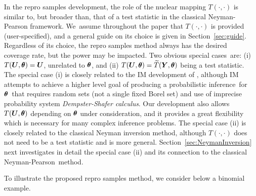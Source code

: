 \documentclass[12pt]{article}
\theoremstyle{shortspace}
\def\*#1{\bm{#1}}
\def\btheta{\mathop{\theta\kern-.45em\hbox{$\theta$}}\nolimits}
\begin{document}
In the repro samples development, the role of the nuclear mapping  $T(\cdot, \cdot)$ is similar to, but broader than, that of a test statistic in the classical Neyman-Pearson framework. We~assume throughout the paper that  $T(\cdot, \cdot)$ is provided (user-specified), and    
a general guide on its choice is given in  Section~\ref{sec:guide}.
Regardless of its choice, the repro samples method always has the desired coverage rate, but the power may be impacted.
Two obvious special cases~are: (i) 
$T(\*U,\btheta) = \*U$, unrelated to $\btheta$, and (ii) $T(\*U,\btheta) = \widetilde T(\*Y, \btheta)$ being a test statistic.   
The special case (i) 
is closely related to the IM development of \cite{martin2013inferential}, although IM attempts to achieve a higher level goal of producing a  probabilistic inference~for~$\btheta$~that requires random sets (not a single fixed Borel set) and use of imprecise probability system {\it Dempster-Shafer calculus}.
Our development also allows $T(\*U,\btheta)$ depending on $\btheta$ under consideration, and it provides a great  flexibility which is necessary for many complex inference problems.
The special case (ii)  is closely related to the classical Neyman inversion method, although $T(\cdot, \cdot)$ does not need to be a test statistic and is more general. Section~\ref{sec:NeymanInversion} next investigates in detail the special case (ii) and its connection to the classical Neyman-Pearson~method.  
 

To illustrate the proposed repro samples method, we consider below a binomial example. 
\end{document}
